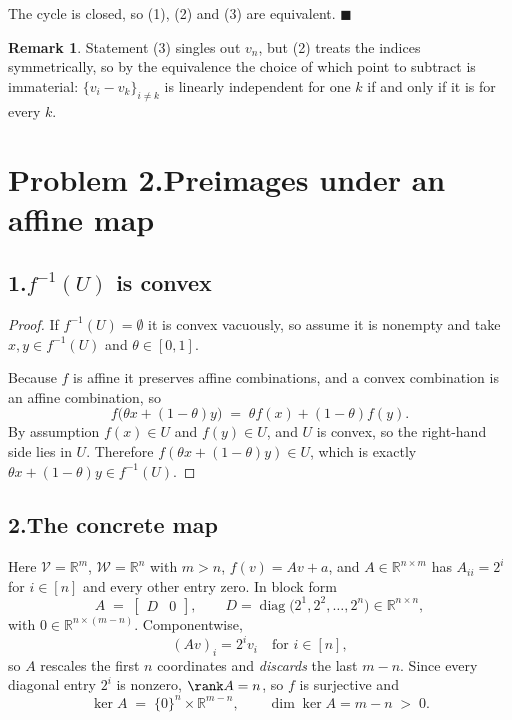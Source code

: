 \documentclass[11pt]{article}
\DeclareMathOperator{\dimop}{dim}
\theoremstyle{definition}
\newtheorem{remark}{Remark}
\theoremstyle{plain}
\begin{document}
The cycle is closed, so (1), (2) and (3) are equivalent. $\blacksquare$

\begin{remark}
Statement (3) singles out $v_n$, but (2) treats the indices
symmetrically, so by the equivalence the choice of which point to
subtract is immaterial: $\{v_i - v_k\}_{i \ne k}$ is linearly
independent for one $k$ if and only if it is for every $k$.
\end{remark}

\section*{Problem 2.\quad Preimages under an affine map \quad[15 pts]}

\subsection*{1.\quad $f^{-1}(U)$ is convex}

\begin{proof}
If $f^{-1}(U) = \emptyset$ it is convex vacuously, so assume it is
nonempty and take $x, y \in f^{-1}(U)$ and $\theta \in [0,1]$.

Because $f$ is affine it preserves affine combinations, and a convex
combination is an affine combination, so
\[
  f\big( \theta x + (1-\theta) y \big)
  \;=\; \theta f(x) + (1-\theta) f(y) .
\]
By assumption $f(x) \in U$ and $f(y) \in U$, and $U$ is convex, so the
right-hand side lies in $U$. Therefore
$f(\theta x + (1-\theta)y) \in U$, which is exactly
$\theta x + (1-\theta) y \in f^{-1}(U)$.
\end{proof}

\subsection*{2.\quad The concrete map}

Here $\mathcal{V} = \mathbb{R}^m$, $\mathcal{W} = \mathbb{R}^n$ with
$m > n$, $f(v) = Av + a$, and $A \in \mathbb{R}^{n \times m}$ has
$A_{ii} = 2^i$ for $i \in [n]$ and every other entry zero. In block
form
\[
  A \;=\; \begin{bmatrix} D & 0 \end{bmatrix},
  \qquad
  D = \operatorname{diag}\big(2^1, 2^2, \dots, 2^n\big)
    \in \mathbb{R}^{n \times n},
\]
with $0 \in \mathbb{R}^{n \times (m-n)}$. Componentwise,
\[
  (Av)_i = 2^i v_i \quad \text{for } i \in [n],
\]
so $A$ rescales the first $n$ coordinates and \emph{discards} the last
$m - n$. Since every diagonal entry $2^i$ is nonzero, $\rank A = n$, so
$f$ is surjective and
\[
  \ker A \;=\; \{0\}^n \times \mathbb{R}^{m-n},
  \qquad \dimop \ker A = m - n \;>\; 0 .
\]
\end{document}
